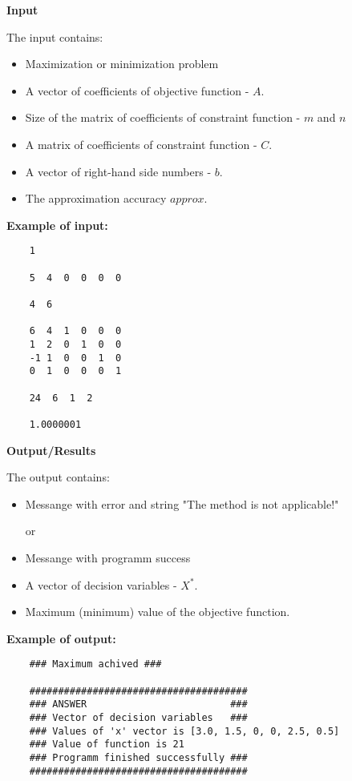 \documentclass[12pt, legalpaper]{exam}
\begin{document}
\noindent     \textbf{Input}

\vspace{12pt}
The input contains:
\begin{itemize}
    \item Maximization or minimization problem
    \item A vector of coefficients of objective function - $A$.
    \item Size of the matrix of coefficients of constraint function - $m$ and $n$
    \item A matrix of coefficients of constraint function - $C$.
    \item A vector of right-hand side numbers - $b$.
    \item The approximation accuracy $approx$.
\end{itemize}

\vspace{12pt}
\textbf{Example of input:}
\begin{verbatim}
    1 
    
    5  4  0  0  0  0

    4  6

    6  4  1  0  0  0 
    1  2  0  1  0  0
    -1 1  0  0  1  0
    0  1  0  0  0  1

    24  6  1  2

    1.0000001
\end{verbatim}

\vspace{12pt}
\noindent     \textbf{Output/Results}

The output contains:
\begin{itemize}
    \item Messange with error and string "The method is not applicable!"
    
or
    \item Messange with programm success
    \item A vector of decision variables - $X^*$.
    \item Maximum (minimum) value of the objective function.
\end{itemize}

\vspace{12pt}
\textbf{Example of output:}

\begin{verbatim}
    ### Maximum achived ###

    ######################################
    ### ANSWER                         ###
    ### Vector of decision variables   ###
    ### Values of 'x' vector is [3.0, 1.5, 0, 0, 2.5, 0.5]
    ### Value of function is 21
    ### Programm finished successfully ###
    ######################################
\end{verbatim}
\end{document}

